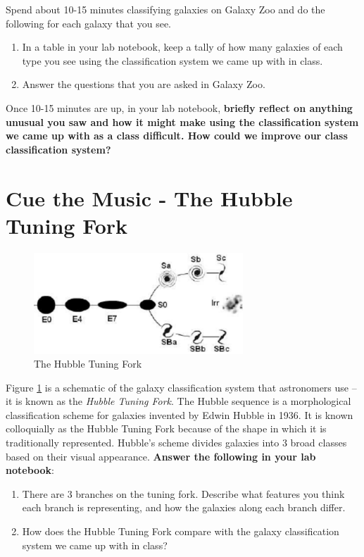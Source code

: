 \documentclass[11pt]{article}
\begin{document}
\medskip \noindent
Spend about 10-15 minutes classifying galaxies on Galaxy Zoo and do the following for each galaxy that you see.
\begin{enumerate}
    \item In a table in your lab notebook, keep a tally of how many galaxies of each type you see using the classification system we came up with in class.
    \item Answer the questions that you are asked in Galaxy Zoo.
\end{enumerate}
Once 10-15 minutes are up, in your lab notebook, \textbf{briefly reflect on anything unusual you saw and how it might make using the classification system we came up with as a class difficult. How could we improve our class classification system?}

\section{Cue the Music - The Hubble Tuning Fork}

\begin{figure} [h!]
    \centering
    \includegraphics[width=0.7\textwidth]{Images/The-Hubble-tuning-fork.png}
    \caption{The Hubble Tuning Fork}
    \label{fig:Hubble}
\end{figure}

\noindent
Figure \ref{fig:Hubble} is a schematic of the galaxy classification system that astronomers use -- it is known as the \textit{Hubble Tuning Fork}. The Hubble sequence is a morphological classification scheme for galaxies invented by Edwin Hubble in 1936. It is known colloquially as the Hubble Tuning Fork because of the shape in which it is traditionally represented. Hubble's scheme divides galaxies into 3 broad classes based on their visual appearance. \textbf{Answer the following in your lab notebook}:

\begin{enumerate}
    \item There are 3 branches on the tuning fork.  Describe what features you think each branch is representing, and how the galaxies along each branch differ.
    \item How does the Hubble Tuning Fork compare with the galaxy classification system we came up with in class?
\end{enumerate}
\end{document}
